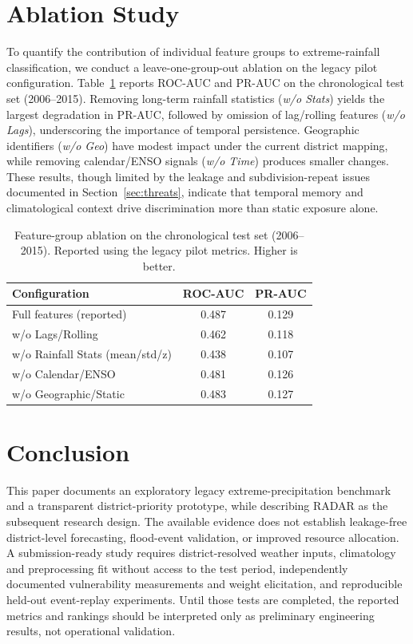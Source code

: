 \documentclass[conference]{IEEEtran}
\begin{document}
\section{Ablation Study}
\label{sec:ablation}

To quantify the contribution of individual feature groups to extreme-rainfall classification, we conduct a leave-one-group-out ablation on the legacy pilot configuration. Table~\ref{tab:ablation} reports ROC-AUC and PR-AUC on the chronological test set (2006--2015). Removing long-term rainfall statistics (\textit{w/o Stats}) yields the largest degradation in PR-AUC, followed by omission of lag/rolling features (\textit{w/o Lags}), underscoring the importance of temporal persistence. Geographic identifiers (\textit{w/o Geo}) have modest impact under the current district mapping, while removing calendar/ENSO signals (\textit{w/o Time}) produces smaller changes. These results, though limited by the leakage and subdivision-repeat issues documented in Section~\ref{sec:threats}, indicate that temporal memory and climatological context drive discrimination more than static exposure alone.

\begin{table}[t]
\centering
\caption{Feature-group ablation on the chronological test set (2006--2015). Reported using the legacy pilot metrics. Higher is better.}
\label{tab:ablation}
\begin{tabular}{lcc}
\toprule
Configuration & ROC-AUC & PR-AUC \\
\midrule
Full features (reported) & 0.487 & 0.129 \\
w/o Lags/Rolling & 0.462 & 0.118 \\
w/o Rainfall Stats (mean/std/z) & 0.438 & 0.107 \\
w/o Calendar/ENSO & 0.481 & 0.126 \\
w/o Geographic/Static & 0.483 & 0.127 \\
\bottomrule
\end{tabular}
\end{table}

\section{Conclusion}

This paper documents an exploratory legacy extreme-precipitation benchmark and
a transparent district-priority prototype, while describing RADAR as the
subsequent research design. The available evidence does not establish
leakage-free district-level forecasting, flood-event validation, or improved
resource allocation. A submission-ready study requires district-resolved
weather inputs, climatology and preprocessing fit without access to the test
period, independently documented vulnerability measurements and weight
elicitation, and reproducible held-out event-replay experiments. Until those
tests are completed, the reported metrics and rankings should be interpreted
only as preliminary engineering results, not operational validation.



\end{document}
